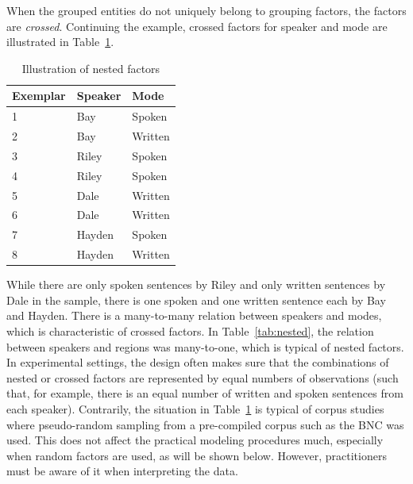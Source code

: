 \documentclass[a4paper,12pt]{article}
\begin{document}
When the grouped entities do not uniquely belong to grouping factors, the factors are \textit{crossed}.
Continuing the example, crossed factors for speaker and mode are illustrated in Table~\ref{tab:crossed}.
%
\begin{table}
  \centering
  \begin{tabular}{lll}
    \toprule
    \textbf{Exemplar} & \textbf{Speaker}  & \textbf{Mode}   \\
    \midrule
                    1 &           Bay    &         Spoken  \\
                    2 &           Bay    &         Written \\
                    3 &           Riley  &         Spoken  \\
                    4 &           Riley  &         Spoken  \\
                    5 &           Dale   &         Written \\
                    6 &           Dale   &         Written \\
                    7 &           Hayden &         Spoken  \\
                    8 &           Hayden &         Written \\
    \bottomrule
  \end{tabular}
  \caption{Illustration of nested factors}
  \label{tab:crossed}
\end{table}
%
While there are only spoken sentences by Riley and only written sentences by Dale in the sample, there is one spoken and one written sentence each by Bay and Hayden.
There is a many-to-many relation between speakers and modes, which is characteristic of crossed factors.
In Table~\ref{tab:nested}, the relation between speakers and regions was many-to-one, which is typical of nested factors.
In experimental settings, the design often makes sure that the combinations of nested or crossed factors are represented by equal numbers of observations (such that, for example, there is an equal number of written and spoken sentences from each speaker).
Contrarily, the situation in Table~\ref{tab:crossed} is typical of corpus studies where pseudo-random sampling from a pre-compiled corpus such as the BNC was used.
This does not affect the practical modeling procedures much, especially when random factors are used, as will be shown below.
However, practitioners must be aware of it when interpreting the data.
\end{document}
